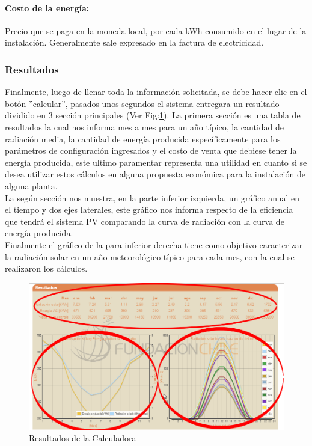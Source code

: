 \paragraph{Costo de la energía:} Precio que se paga en la moneda local, por cada kWh consumido en el lugar de la instalación.
Generalmente sale expresado en la factura de electricidad.

\subsubsection{Resultados}
Finalmente, luego de llenar toda la información solicitada, se debe hacer clic en el botón ''calcular'', pasados unos segundos el sistema entregara un resultado dividido en 3 sección principales (Ver Fig:\ref{resultadosCalc}). La primera sección es una tabla de resultados la cual nos informa mes a mes para un año típico, la cantidad de radiación media, la cantidad de energía producida específicamente para los parámetros de configuración ingresados y el costo de venta que debiese tener la energía producida, este ultimo paramentar representa una utilidad en cuanto si se desea utilizar estos cálculos en alguna propuesta económica para la instalación de alguna planta.\\ La según sección nos muestra, en la parte inferior izquierda, un gráfico anual en el tiempo y dos ejes laterales, este gráfico nos informa respecto de la eficiencia que tendrá el sistema PV comparando la curva de radiación con la curva de energía producida.\\ Finalmente el gráfico de la para inferior derecha tiene como objetivo caracterizar la radiación solar en un año meteorológico típico para cada mes, con la cual se realizaron los cálculos.

\begin{figure}[h]
        \centering
        \includegraphics[scale=0.4]{./images/cap5chap1img9}
        \caption{Resultados de la Calculadora}
        \label{resultadosCalc}
\end{figure}

